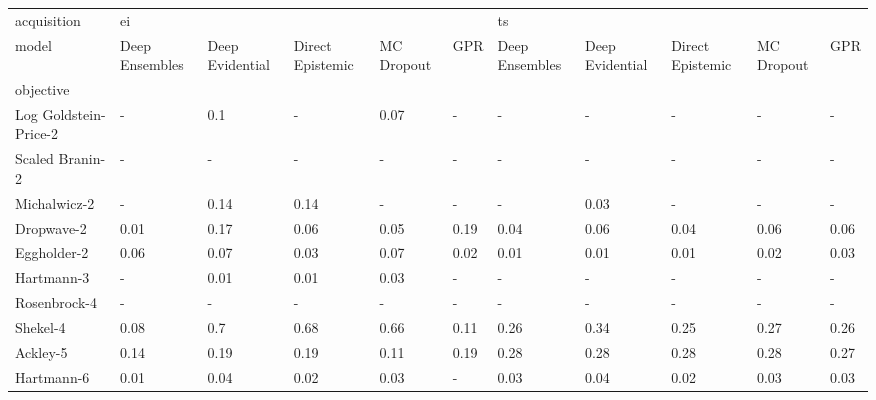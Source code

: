 \begin{tabular}{lllllllllll}
\toprule
acquisition & \multicolumn{5}{l}{ei} & \multicolumn{5}{l}{ts} \\
model & Deep Ensembles & Deep Evidential & Direct Epistemic & MC Dropout &   GPR & Deep Ensembles & Deep Evidential & Direct Epistemic & MC Dropout &   GPR \\
objective             &                &                 &                  &            &       &                &                 &                  &            &       \\
\midrule
Log Goldstein-Price-2 &              - &             0.1 &                - &       0.07 &     - &              - &               - &                - &          - &     - \\
Scaled Branin-2       &              - &               - &                - &          - &     - &              - &               - &                - &          - &     - \\
Michalwicz-2          &              - &            0.14 &             0.14 &          - &     - &              - &            0.03 &                - &          - &     - \\
Dropwave-2            &           0.01 &            0.17 &             0.06 &       0.05 &  0.19 &           0.04 &            0.06 &             0.04 &       0.06 &  0.06 \\
Eggholder-2           &           0.06 &            0.07 &             0.03 &       0.07 &  0.02 &           0.01 &            0.01 &             0.01 &       0.02 &  0.03 \\
Hartmann-3            &              - &            0.01 &             0.01 &       0.03 &     - &              - &               - &                - &          - &     - \\
Rosenbrock-4          &              - &               - &                - &          - &     - &              - &               - &                - &          - &     - \\
Shekel-4              &           0.08 &             0.7 &             0.68 &       0.66 &  0.11 &           0.26 &            0.34 &             0.25 &       0.27 &  0.26 \\
Ackley-5              &           0.14 &            0.19 &             0.19 &       0.11 &  0.19 &           0.28 &            0.28 &             0.28 &       0.28 &  0.27 \\
Hartmann-6            &           0.01 &            0.04 &             0.02 &       0.03 &     - &           0.03 &            0.04 &             0.02 &       0.03 &  0.03 \\
\bottomrule
\end{tabular}
